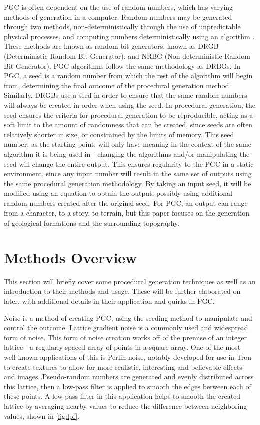 \documentclass[10pt]{report}
\begin{document}
		PGC is often dependent on the use of random numbers, which has varying methods of generation in a computer. Random numbers may be generated through two methods, non-deterministically through the use of unpredictable physical processes, and computing numbers deterministically using an algorithm \cite{rng}. These methods are known as random bit generators, known as DRGB (Deterministic Random Bit Generator), and NRBG (Non-deterministic Random Bit Generator). PGC algorithms follow the same methodology as DRBGs. In PGC, a seed is a random number from which the rest of the algorithm will begin from, determining the final outcome of the procedural generation method. Similarly, DRGBs use a seed in order to ensure that the same random numbers will always be created in order when using the seed. In procedural generation, the seed ensures the criteria for procedural generation to be reproducible, acting as a soft limit to the amount of randomness that can be created, since seeds are often relatively shorter in size, or constrained by the limits of memory. This seed number, as the starting point, will only have meaning in the context of the same algorithm it is being used in - changing the algorithms and/or manipulating the seed will change the entire output. This ensures regularity to the PGC in a static environment, since any input number will result in the same set of outputs using the same procedural generation methodology. By taking an input seed, it will be modified using an equation to obtain the output, possibly using additional random numbers created after the original seed. For PGC, an output can range from a character, to a story, to terrain, but this paper focuses on the generation of geological formations and the surrounding topography.
	
		\section{Methods Overview}
		This section will briefly cover some procedural generation techniques as well as an introduction to their methods and usage. These will be further elaborated on later, with additional details in their application and quirks in PGC. 
		
		Noise is a method of creating PGC, using the seeding method to manipulate and control the outcome. Lattice gradient noise is a commonly used and widespread form of noise. This form of noise creation works off of the premise of an integer lattice - a regularly spaced array of points in a square array\cite{integer-lattice}. One of the most well-known applications of this is Perlin noise, notably developed for use in Tron to create textures to allow for more realistic, interesting and believable effects and images \cite{ken-perlin}.Pseudo-random numbers are generated and evenly distributed across this lattice, then a low-pass filter is applied to smooth the edges between each of these points. A low-pass filter in this application helps to smooth the created lattice by averaging nearby values to reduce the difference between neighboring values, shown in \autoref{fig:lpf}. 
		
\end{document}
